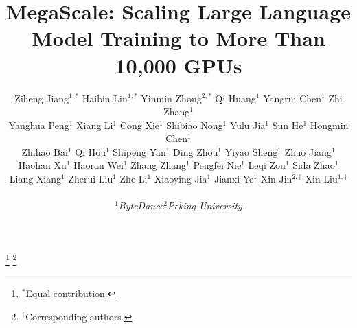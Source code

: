 \documentclass[letterpaper,twocolumn,10pt]{article}
\begin{document}
\sloppy
\date{}


\title{MegaScale: Scaling Large Language Model Training to More Than 10,000 GPUs}


\author{
\vspace{-0.1in}
\rm{
    Ziheng Jiang$^{\text{1}, *}$ \enskip
    Haibin Lin$^{\text{1}, *}$ \enskip
    Yinmin Zhong$^{\text{2}, *}$ \enskip
    Qi Huang$^{\text{1}}$ \enskip
    Yangrui Chen$^{\text{1}}$ \enskip
    Zhi Zhang$^{\text{1}}$ \enskip\\
}
\vspace{-0.1in}
\rm{
    Yanghua Peng$^{\text{1}}$ \enskip
    Xiang Li$^{\text{1}}$ \enskip
    Cong Xie$^{\text{1}}$ \enskip
    Shibiao Nong$^{\text{1}}$ \enskip
    Yulu Jia$^{\text{1}}$ \enskip
    Sun He$^{\text{1}}$ \enskip
    Hongmin Chen$^{\text{1}}$ \enskip\\
}
\vspace{-0.1in}
\rm{
    Zhihao Bai$^{\text{1}}$ \enskip
    Qi Hou$^{\text{1}}$ \enskip
    Shipeng Yan$^{\text{1}}$ \enskip
    Ding Zhou$^{\text{1}}$ \enskip
    Yiyao Sheng$^{\text{1}}$ \enskip
    Zhuo Jiang$^{\text{1}}$ \enskip\\
}
\vspace{-0.1in}
\rm{
    Haohan Xu$^{\text{1}}$ \enskip
    Haoran Wei$^{\text{1}}$ \enskip
    Zhang Zhang$^{\text{1}}$ \enskip
    Pengfei Nie$^{\text{1}}$ \enskip
    Leqi Zou$^{\text{1}}$ \enskip
    Sida Zhao$^{\text{1}}$ \enskip\\
}
\vspace{-0.1in}
\rm{
    Liang Xiang$^{\text{1}}$ \enskip
    Zherui Liu$^{\text{1}}$ \enskip
    Zhe Li$^{\text{1}}$ \enskip
    Xiaoying Jia$^{\text{1}}$ \enskip
    Jianxi Ye$^{\text{1}}$ \enskip
    Xin Jin$^{\text{2}, \dag}$ \enskip
    Xin Liu$^{\text{1}, \dag}$ \enskip\\
}

{$^{\text{1}}$\textit{ByteDance}\enskip $^{\text{2}}$\textit{Peking University}\enskip}
}

\maketitle
\pagestyle{plain}
\captionsetup[figure]{font=small}
\captionsetup[table]{font=small}

{\let\thefootnote\relax\footnote{{$^*$Equal contribution.}}}
{\let\thefootnote\relax\footnote{{$^\dag$Corresponding authors.}}}



%







\label{lastpage}

{%

}

\clearpage
% 
\end{document}
